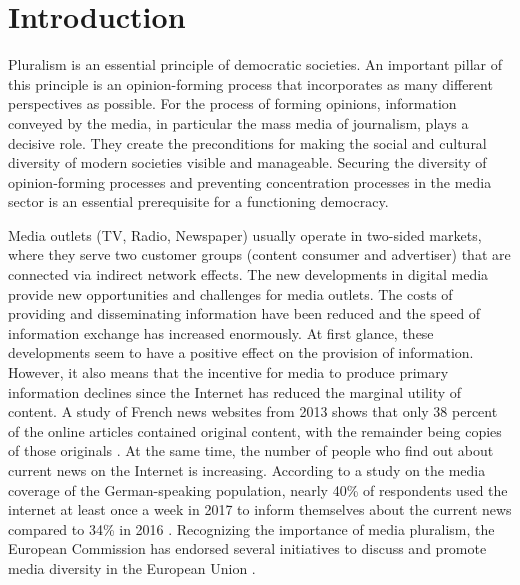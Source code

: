 \documentclass[12pt,a4paper,notitlepage]{article}
\begin{document}
\section{Introduction}

Pluralism is an essential principle of democratic societies. An important pillar of this principle is an opinion-forming process that incorporates as many different perspectives as possible. For the process of forming opinions, information conveyed by the media, in particular the mass media of journalism, plays a decisive role. They create the preconditions for making the social and cultural diversity of modern societies visible and manageable. Securing the diversity of opinion-forming processes and preventing concentration processes in the media sector is an essential prerequisite for a functioning democracy. 

Media outlets (TV, Radio, Newspaper) usually operate in two-sided markets, where they serve two customer groups (content consumer and advertiser) that are connected via indirect network effects. The new developments in digital media provide new opportunities and challenges for media outlets. The costs of providing and disseminating information have been reduced and the speed of information exchange has increased enormously. At first glance, these developments seem to have a positive effect on the provision of information. However, it also means that the incentive for media to produce primary information declines since the Internet has reduced the marginal utility of content. A study of French news websites from 2013 shows that only 38 percent of the online articles contained original content, with the remainder being copies of those originals \citep{cage_information_2017}. At the same time, the number of people who find out about current news on the Internet is increasing. According to a study on the media coverage of the German-speaking population, nearly 40\% of respondents used the internet at least once a week in 2017 to inform themselves about the current news compared to 34\% in 2016 \citep{vuma_arbeitsgemeinschaft_verbrauchs-_und_medienanalyse_verbrauchs-_2017}. Recognizing the importance of media pluralism, the European Commission has endorsed several initiatives to discuss and promote media diversity in the European Union \citep{_media_2014}. 
\end{document}
